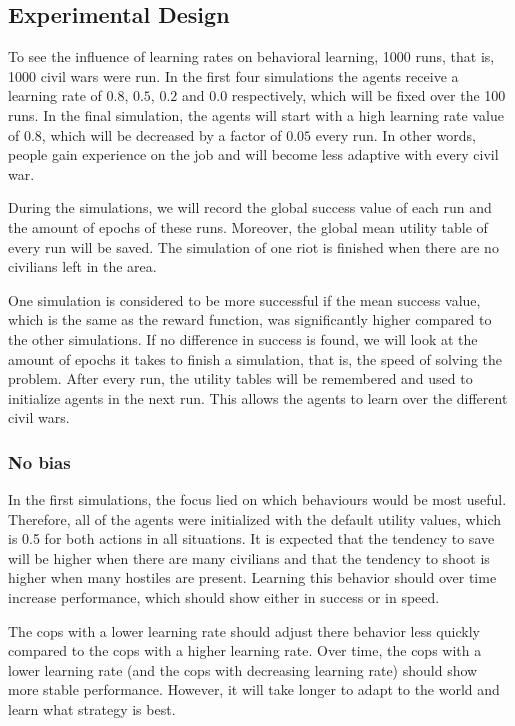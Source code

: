 \subsection{Experimental Design}
To see the influence of learning rates on behavioral learning, 1000 runs, that is, 1000 civil wars were run. In the first four simulations the agents receive a learning rate of $0.8$, $0.5$, $0.2$ and $0.0$ respectively, which will be fixed over the 100 runs. In the final simulation, the agents will start with a high learning rate value of $0.8$, which will be decreased by a factor of $0.05$ every run. In other words, people gain experience on the job and will become less adaptive with every civil war. 

During the simulations, we will record the global success value of each run and the amount of epochs of these runs. Moreover, the global mean utility table of every run will be saved. The simulation of one riot is finished when there are no civilians left in the area. 

One simulation is considered to be more successful if the mean success value, which is the same as the reward function, was significantly higher compared to the other simulations. If no difference in success is found, we will look at the amount of epochs it takes to finish a simulation, that is, the speed of solving the problem. After every run, the utility tables will be remembered and used to initialize agents in the next run. This allows the agents to learn over the different civil wars. 

\subsubsection{No bias}
In the first simulations, the focus lied on which behaviours would be most useful. Therefore, all of the agents were initialized with the default utility values, which is 0.5 for both actions in all situations. It is expected that the tendency to save will be higher when there are many civilians and that the tendency to shoot is higher when many hostiles are present. Learning this behavior should over time increase performance, which should show either in success or in speed. 

The cops with a lower learning rate should adjust there behavior less quickly compared to the cops with a higher learning rate. Over time, the cops with a lower learning rate (and the cops with decreasing learning rate) should show more stable performance. However, it will take longer to adapt to the world and learn what strategy is best. 

